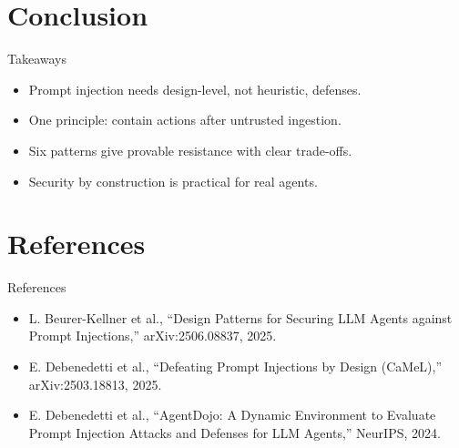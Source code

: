 \documentclass{beamer}
\begin{document}
\section{Conclusion}
\begin{frame}{Takeaways}
\begin{itemize}
\item Prompt injection needs design-level, not heuristic, defenses.
\item One principle: contain actions after untrusted ingestion.
\item Six patterns give provable resistance with clear trade-offs.
\item Security by construction is practical for real agents.
\end{itemize}
\end{frame}

\section{References}
\begin{frame}{References}
\footnotesize
\begin{itemize}
\item L. Beurer-Kellner et al., ``Design Patterns for Securing LLM Agents against Prompt Injections,'' arXiv:2506.08837, 2025.
\item E. Debenedetti et al., ``Defeating Prompt Injections by Design (CaMeL),'' arXiv:2503.18813, 2025.
\item E. Debenedetti et al., ``AgentDojo: A Dynamic Environment to Evaluate Prompt Injection Attacks and Defenses for LLM Agents,'' NeurIPS, 2024.
\end{itemize}
\end{frame}
\begin{frame}\vfill{}\vfill\end{frame}
\end{document}
